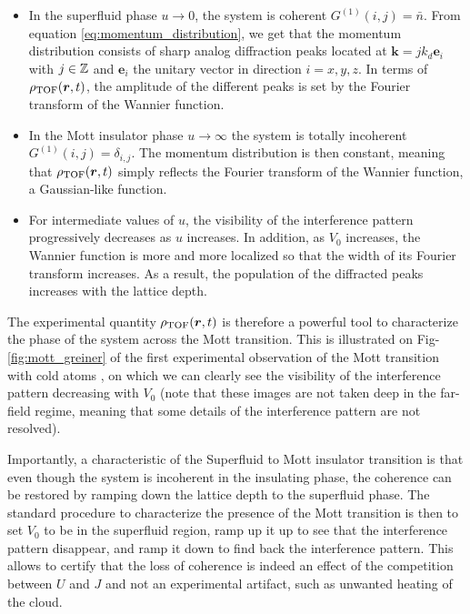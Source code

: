 \begin{itemize}
    \item In the superfluid phase $u \to 0$, the system is coherent $G^{(1)}(i,j) = \bar{n}$. From equation \ref{eq:momentum_distribution}, we get that the momentum distribution consists of sharp analog diffraction peaks located at $\bm{k} = j k_d \bm{e}_i$ with $j \in \mathbb{Z}$ and $\bm{e}_i$ the unitary vector in direction $i=x,y,z$. In terms of $\rho_{\rm{TOF}}(\bm{r},t)$, the amplitude of the different peaks is set by the Fourier transform of the Wannier function. 
    
    \item In the Mott insulator phase $u \to \infty$ the system is totally incoherent $G^{(1)}(i,j) = \delta_{i,j}$. The momentum distribution is then constant, meaning that $\rho_{\rm{TOF}}(\bm{r},t)$ simply reflects the Fourier transform of the Wannier function, \ie a Gaussian-like function.
    
    \item For intermediate values of $u$, the visibility of the interference pattern progressively decreases as $u$ increases. In addition, as $V_0$ increases, the Wannier function is more and more localized so that the width of its Fourier transform increases. As a result, the population of the diffracted peaks increases with the lattice depth.
\end{itemize}

The experimental quantity $\rho_{\rm{TOF}}(\bm{r},t)$ is therefore a powerful tool to characterize the phase of the system across the Mott transition. This is illustrated on Fig-\ref{fig:mott_greiner} of the first experimental observation of the Mott transition with cold atoms \cite{greiner2002quantum}, on which we can clearly see the visibility of the interference pattern decreasing with $V_0$ (note that these images are not taken deep in the far-field regime, meaning that some details of the interference pattern are not resolved).

Importantly, a characteristic of the Superfluid to Mott insulator transition is that even though the system is incoherent in the insulating phase, the coherence can be restored by ramping down the lattice depth to the superfluid phase. The standard procedure to characterize the presence of the Mott transition is then to set $V_0$ to be in the superfluid region, ramp up it up to see that the interference pattern disappear, and ramp it down to find back the interference pattern. This allows to certify that the loss of coherence is indeed an effect of the competition between $U$ and $J$ and not an experimental artifact, such as unwanted heating of the cloud. 

